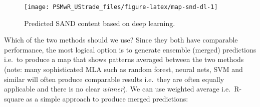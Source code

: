\documentclass[graybox,natbib,nospthms,UStrade]{svmono}
\newenvironment{Shaded}{\begin{snugshade}}{\end{snugshade}}
\newcommand{\DataTypeTok}[1]{\textcolor[rgb]{0.27,0.27,0.27}{#1}}
\newcommand{\KeywordTok}[1]{\textcolor[rgb]{0.27,0.27,0.27}{\textbf{#1}}}
\newcommand{\NormalTok}[1]{#1}
\newcommand{\OperatorTok}[1]{\textcolor[rgb]{0.43,0.43,0.43}{\textbf{#1}}}
\newcommand{\OtherTok}[1]{\textcolor[rgb]{0.37,0.37,0.37}{#1}}
\newcommand{\StringTok}[1]{\textcolor[rgb]{0.5,0.5,0.5}{#1}}
\begin{document}
\begin{Shaded}
\end{Shaded}

\begin{figure}[H]

{\centering \texttt{[image: PSMwR\_UStrade\_files/figure-latex/map-snd-dl-1]} 

}

\caption{Predicted SAND content based on deep learning.}\label{fig:map-snd-dl}
\end{figure}

Which of the two methods should we use? Since they both have comparable performance, the most logical option is to generate ensemble (merged) predictions i.e.~to produce a map that shows patterns averaged between the two methods (note: many sophisticated MLA such as random forest, neural nets, SVM and similar will often produce comparable results i.e.~they are often equally applicable and there is no clear \emph{winner}). We can use weighted average i.e.~R-square as a simple approach to produce merged predictions:

\begin{Shaded}
\end{Shaded}
\end{document}
